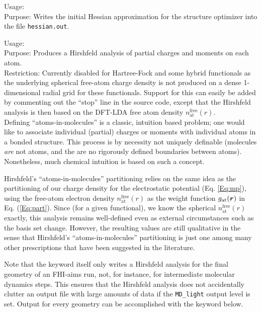 {
  \noindent
  Usage:   \\[1.0ex]
  Purpose: Writes the initial Hessian approximation for the structure
  optimizer into the file \texttt{hessian.out}. \\[1.0ex]
}

{
  \noindent
  Usage:   \\[1.0ex]
  Purpose: Produces a Hirshfeld analysis of partial charges and
    moments on each atom. \\[1.0ex]
  Restriction: Currently disabled for Hartree-Fock and some hybrid
    functionals as the underlying spherical free-atom charge density
    is not produced on a dense 1-dimensional radial grid for these
    functionals. Support for this can easily be added by commenting
    out the ``stop'' line in the source code, except that the
    Hirshfeld analysis is then based on the DFT-LDA free atom density
    $n_\text{at}^\text{free}(r)$. \\[1.0ex]
}
Defining ``atoms-in-molecules'' is a classic, intuition based problem;
one would like to associate individual (partial) charges or moments
with individual atoms in a bonded structure. This process is by
necessity not uniquely definable (molecules \emph{are} not atoms, and
the are no rigorously defined boundaries between atoms). Nonetheless,
much chemical intuition is based on such a concept. 

Hirshfeld's \cite{Hirshfeld77} ``atoms-in-molecules'' partitioning
relies on the same idea as the partitioning of our charge density for
the electrostatic potential (Eq. \ref{Eq:mp}), using the free-atom
electron density $n_\text{at}^\text{free}(r)$ as the weight function
$g_\text{at}(\mbox{\boldmath$r$})$ in Eq. (\ref{Eq:part}). Since (for a given
functional), we know the spherical $n_\text{at}^\text{free}(r)$
exactly, this analysis remains well-defined even as external
circumstances such as the basis set change. However, the resulting
values are still qualitative in the sense that Hirshfeld's
\cite{Hirshfeld77} ``atoms-in-molecules'' partitioning is just one
among many other prescriptions that have been suggested in the
literature. 

Note that the   keyword itself
only writes a Hirshfeld analysis for the final geometry of an FHI-aims
run, not, for 
instance, for intermediate molecular dynamics steps. This ensures that the
Hirshfeld analysis does not accidentally clutter an output file with large
amounts of data if the  \texttt{MD\_light}
output level is set. Output for every geometry can be accomplished
with the  
keyword below.

